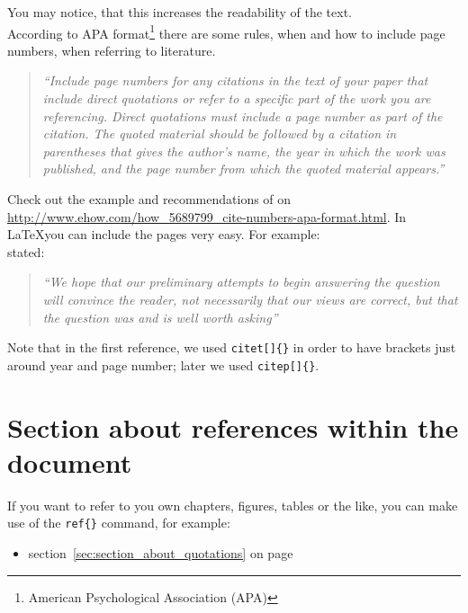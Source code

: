 \documentclass[a4paper]{article}
\begin{document}
You may notice, that this increases the readability of the text. \\

According to APA format\footnote{ American Psychological Association (APA)} there are some rules, when and how to include page numbers, when referring to literature. 

\begin{quotation}
	\emph{``Include page numbers for any citations in the text of your paper that include direct quotations or refer to a specific part of the work you are referencing. Direct quotations must include a page number as part of the citation. The quoted material should be followed by a citation in parentheses that gives the author's name, the year in which the work was published, and the page number from which the quoted material appears.''}
	\citep{Hall}
\end{quotation}

Check out the example and recommendations of \cite{Hall} on \url{http://www.ehow.com/how_5689799_cite-numbers-apa-format.html}. In \LaTeX you can include the pages very easy. For example: \\

\citet[p. 86]{Baddeley:1974ts} stated: 

\begin{quotation}
	\emph{``We hope that our preliminary attempts to begin answering the question will convince the reader, not necessarily that our views are correct, but that the question was and is well worth asking''}
	\citep[p. 86]{Baddeley:1974ts}
\end{quotation}

Note that in the first reference, we used \texttt{citet[]\{\}} in order to have brackets just around year and page number; later we used \texttt{citep[]\{\}}.



\section{Section about references within the document} %
\label{sec:section_about_references_within_the_document}

If you want to refer to you own chapters, figures, tables or the like, you can make use of the \texttt{ref\{\}} command, for example:
\begin{itemize}
	\item section~\ref{sec:section_about_quotations} on page \pageref{sec:section_about_quotations}
\end{itemize} 
\end{document}
